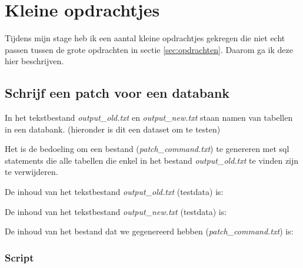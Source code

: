 
\section{Kleine opdrachtjes}

Tijdens mijn stage heb ik een aantal kleine opdrachtjes gekregen die niet echt passen tussen de grote opdrachten in sectie \ref{sec:opdrachten}. Daarom ga ik deze hier beschrijven.

\subsection{Schrijf een patch voor een databank}
\label{subsec:tables_patch}

In het tekstbestand \emph{output\_old.txt} en \emph{output\_new.txt} staan namen van tabellen in een databank. (hieronder is dit een dataset om te testen)

Het is de bedoeling om een bestand (\emph{patch\_command.txt}) te genereren met sql statements die alle tabellen die enkel in het bestand \emph{output\_old.txt} te vinden zijn te verwijderen.

De inhoud van het tekstbestand \emph{output\_old.txt} (testdata) is:



De inhoud van het tekstbestand \emph{output\_new.txt} (testdata) is:



De inhoud van het bestand dat we gegenereerd hebben (\emph{patch\_command.txt}) is:



\subsubsection{Script}

